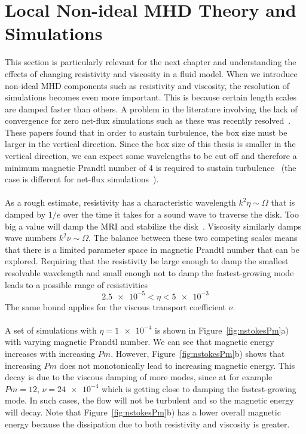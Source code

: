 \section{Local Non-ideal MHD Theory and Simulations} \label{sec:localnonideal}
This section is particularly relevant for the next chapter and understanding the effects of changing resistivity and viscosity in a fluid model. When we introduce non-ideal MHD components such as resistivity and viscosity, the resolution of simulations becomes even more important. This is because certain length scales are damped faster than others. A problem in the literature involving the lack of convergence for zero net-flux simulations such as these was recently resolved~\cite{Fromang2007a,Shi2016,Walker2017}. These papers found that in order to sustain turbulence, the box size must be larger in the vertical direction. Since the box size of this thesis is smaller in the vertical direction, we can expect some wavelengths to be cut off and therefore a minimum magnetic Prandtl number of 4 is required to sustain turbulence~\cite{Fromang2007b,Simon2009a} (the case is different for net-flux simulations~\cite{Simon2009b}).\\
\\
As a rough estimate, resistivity has a characteristic wavelength $k^2\eta\sim\Omega$ that is damped by $1/e$ over the time it takes for a sound wave to traverse the disk. Too big a value will damp the MRI and stabilize the disk~\cite{Fleming2000}. Viscosity similarly damps wave numbers $k^2\nu\sim\Omega$. The balance between these two competing scales means that there is a limited parameter space in magnetic Prandtl number that can be explored. Requiring that the resistivity be large enough to damp the smallest resolvable wavelength and small enough not to damp the fastest-growing mode leads to a possible range of resistivities
\begin{equation*}
 \num{2.5e-5}<\eta<\num{5e-3}
\end{equation*}
The same bound applies for the viscous transport coefficient $\nu$.\\
\\
A set of simulations with $\eta=\num{1e-4}$ is shown in Figure~\ref{fig:nstokesPm}a) with varying magnetic Prandtl number. We can see that magnetic energy increases with increasing $Pm$. However, Figure~\ref{fig:nstokesPm}b) shows that increasing $Pm$ does not monotonically lead to increasing magnetic energy. This decay is due to the viscous damping of more modes, since at for example $Pm=12$, $\nu=\num{24e-4}$ which is getting close to damping the fastest-growing mode. In such cases, the flow will not be turbulent and so the magnetic energy will decay. Note that Figure~\ref{fig:nstokesPm}b) has a lower overall magnetic energy because the dissipation due to both resistivity and viscosity is greater.
